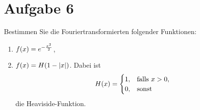\documentclass{exercise}
\begin{document}
    \section*{Aufgabe 6}
    
    \begin{problem}
        Bestimmen Sie die Fouriertransformierten folgender Funktionen:
        \begin{enumerate}
            \item \(f\parentheses*{x} = e^{-\frac{x^2}{2}}\),
            \item \(f\parentheses*{x} = H\parentheses*{1 - \absolute*{x}}\).
            Dabei ist
            \[
                H\parentheses*{x} = \begin{cases}
                    1, & \text{falls }x > 0,\\
                    0, & \text{sonst}
                \end{cases}
            \]
            die Heaviside-Funktion.
        \end{enumerate}
    \end{problem}
    
\end{document}

